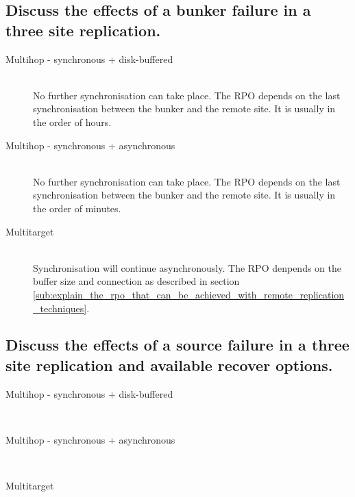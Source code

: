 
\subsection{Discuss the effects of a bunker failure in a three site replication.} %
\label{sub:discuss_the_effects_of_a_bunker_failure}

	\begin{description}
		\item[Multihop - synchronous + disk-buffered] \hfill \\
			No further synchronisation can take place.
			The RPO depends on the last synchronisation between the bunker
			and the remote site.
			It is usually in the order of hours.
		\item[Multihop - synchronous + asynchronous] \hfill \\
			No further synchronisation can take place.
			The RPO depends on the last synchronisation between the bunker
			and the remote site.
			It is usually in the order of minutes.
		\item[Multitarget] \hfill \\
			Synchronisation will continue asynchronously.
			The RPO denpends on the buffer size and connection
			as described in section \ref{sub:explain_the_rpo_that_can_be_achieved_with_remote_replication_techniques}.
	\end{description}


\subsection{Discuss the effects of a source failure in a three site replication and available recover options.} %
\label{sub:discuss_the_effects_of_a_source_failure_in_a_three_site_replication_and_available_recover_options}

	\begin{description}
		\item[Multihop - synchronous + disk-buffered] \hfill \\
		\item[Multihop - synchronous + asynchronous] \hfill \\
		\item[Multitarget] \hfill \\
	\end{description}


